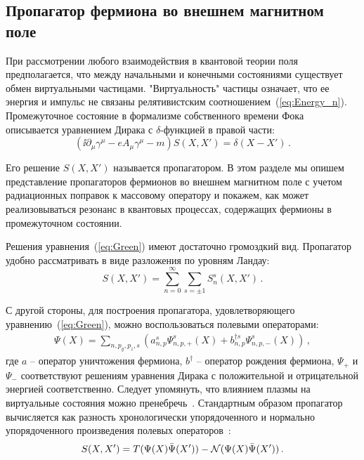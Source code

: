 \subsection{Пропагатор фермиона во внешнем магнитном поле}
При рассмотрении любого взаимодействия в квантовой теории поля предполагается, что между начальными и конечными состояниями существует обмен виртуальными частицами. "Виртуальность" частицы означает, что ее энергия и импульс не связаны релятивистским соотношением~(\ref{eq:Energy_n}). Промежуточное состояние в формализме собственного времени Фока~\cite{Schwinger:1951} описывается уравнением Дирака с $\delta$-функцией в правой части:
%
\begin{equation}\label{eq:Green}
(\ii\partial_\mu \gamma^\mu -e A_\mu \gamma^\mu - m) 
S(X,X')=\delta\left(X-X'\right)\, .
\end{equation}
%

Его решение $S(X,X')$ называется пропагатором. В этом разделе мы опишем представление пропагаторов фермионов во внешнем магнитном поле с учетом радиационных поправок к массовому оператору и покажем, как может реализовываться резонанс в квантовых процессах, содержащих фермионы в промежуточном состоянии.


Решения уравнения~(\ref{eq:Green}) имеют достаточно громоздкий вид. Пропагатор 
удобно рассматривать в виде разложения по уровням Ландау:
\begin{equation}
	S(X,X') = \sum_{n=0}^{\infty}\sum_{s=\pm 1} S_n^s (X,X')\, .
\end{equation}

С другой стороны, для построения пропагатора, удовлетворяющего уравнению~(\ref{eq:Green}), можно воспользоваться полевыми операторами:
%
\begin{eqnarray}\label{eq:FermionWaveF}
\Psi (X) = \sum\limits_{n,p_y,p_z,s} ( a^{s}_{n,p} \Psi_{n,p,+}^s (X) + b^{\dagger s}_{n,p} \Psi_{n,p,-}^s (X) )\,,
\end{eqnarray}
\noindent где $a$ -- оператор уничтожения фермиона, $b^{\dagger}$ -- оператор 
рождения фермиона, $\Psi_{+}$ и $\Psi_{-}$ соответствуют решениям уравнения 
Дирака с положительной и отрицательной энергией соответственно. Следует 
упомянуть, что влиянием плазмы на виртуальные состояния можно 
пренебречь~\cite{Borisov:1997}. Стандартным образом пропагатор вычисляется как 
разность хронологически упорядоченного и нормально упорядоченного произведения 
полевых операторов~\cite{KM_Book_2013}:
%
\begin{equation}\label{eq:SXX}
S(X,X') = T(\Psi(X)\bar{\Psi}(X')) - {\cal N}(\Psi(X)\bar{\Psi}(X'))\, .
\end{equation}
%

